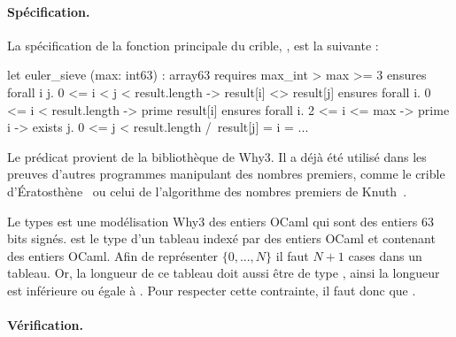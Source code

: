 \documentclass[a4paper]{easychair}
\begin{document}
\paragraph{Spécification.}
La spécification de la fonction principale du crible,
, est la suivante :

\begin{why3}
let euler_sieve (max: int63) : array63
  requires { max_int > max >= 3 }
  ensures  { forall i j. 0 <= i < j < result.length -> result[i] <> result[j] }
  ensures  { forall i. 0 <= i < result.length -> prime result[i] }
  ensures  { forall i. 2 <= i <= max -> prime i ->
                       exists j. 0 <= j < result.length /\ result[j] = i }
= ...
\end{why3}


Le prédicat  provient de la bibliothèque 
de Why3. Il a déjà été utilisé dans les preuves d'autres programmes
manipulant des nombres premiers, comme le crible
d'Ératosthène~\cite{sieve-eratosthene-why3} ou celui de l'algorithme
des nombres premiers de Knuth~\cite{knuth-prime-numbers,knuth-prime-numbers-why3}.


Le types  est une modélisation Why3 des entiers OCaml qui sont
des entiers 63 bits signés.  est le type d'un tableau indexé
par des entiers OCaml et contenant des entiers OCaml.
Afin de représenter $\{0,...,N\}$ il faut $N + 1$ cases dans un tableau.
Or, la longueur de ce tableau doit aussi être de type , ainsi
la longueur est inférieure ou égale à . Pour respecter
cette contrainte, il faut donc que .



\paragraph{Vérification.}
\end{document}
